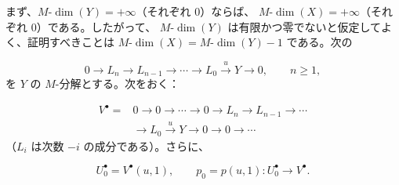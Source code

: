 まず、$M\text{-}\dim(Y)=+\infty$（それぞれ $0$）ならば、
$M\text{-}\dim(X)=+\infty$（それぞれ $0$）である。したがって、
$M\text{-}\dim(Y)$ は有限かつ零でないと仮定してよく、証明すべきことは
$M\text{-}\dim(X)=M\text{-}\dim(Y)-1$ である。次の

\[
0\longrightarrow L_n\longrightarrow L_{n-1}\longrightarrow\cdots
\longrightarrow L_0\xrightarrow{u}Y\longrightarrow0,
\qquad n\geq1,
\]
を $Y$ の $M$-分解とする。次をおく：

\[
\begin{aligned}
V^\bullet={}&0\longrightarrow0\longrightarrow\cdots\longrightarrow0
\longrightarrow L_n\longrightarrow L_{n-1}\longrightarrow\cdots\\
&\longrightarrow L_0\xrightarrow{u}Y\longrightarrow0
\longrightarrow0\longrightarrow\cdots
\end{aligned}
\]
（$L_i$ は次数 $-i$ の成分である）。さらに、

\[
U_0^\bullet=V^\bullet(u,1),
\qquad
p_0=p(u,1)\colon U_0^\bullet\longrightarrow V^\bullet.
\]
\endgroup
